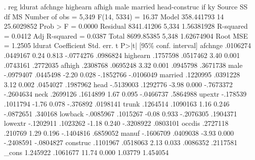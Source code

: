 . reg ldurat afchnge highearn afhigh male married head-construc if ky
{\smallskip}
      Source {\VBAR}       SS           df       MS      Number of obs   =     5,349
   F(14, 5334)     =     16.37
       Model {\VBAR}  358.441793        14  25.6029852   Prob > F        =    0.0000
    Residual {\VBAR}  8341.41206     5,334  1.56381928   R-squared       =    0.0412
   Adj R-squared   =    0.0387
       Total {\VBAR}  8699.85385     5,348  1.62674904   Root MSE        =    1.2505
{\smallskip}
      ldurat {\VBAR} Coefficient  Std. err.      t    P>|t|     [95\% conf. interval]
     afchnge {\VBAR}   .0106274   .0449167     0.24   0.813    -.0774276    .0986824
    highearn {\VBAR}   .1757598   .0517462     3.40   0.001     .0743161    .2772035
      afhigh {\VBAR}   .2308768   .0695248     3.32   0.001     .0945798    .3671738
        male {\VBAR}  -.0979407   .0445498    -2.20   0.028    -.1852766   -.0106049
     married {\VBAR}   .1220995   .0391228     3.12   0.002     .0454027    .1987962
        head {\VBAR}  -.5139003   .1292776    -3.98   0.000    -.7673372   -.2604634
        neck {\VBAR}   .2699126   .1614899     1.67   0.095    -.0466737    .5864988
      upextr {\VBAR}   -.178539   .1011794    -1.76   0.078     -.376892    .0198141
       trunk {\VBAR}   .1264514   .1090163     1.16   0.246    -.0872651     .340168
     lowback {\VBAR}  -.0085967   .1015267    -0.08   0.933    -.2076305    .1904371
     lowextr {\VBAR}  -.1202911   .1023262    -1.18   0.240    -.3208922    .0803101
      occdis {\VBAR}   .2727118    .210769     1.29   0.196    -.1404816    .6859052
       manuf {\VBAR}  -.1606709   .0409038    -3.93   0.000    -.2408591   -.0804827
    construc {\VBAR}   .1101967   .0518063     2.13   0.033     .0086352    .2117581
       _cons {\VBAR}   1.245922   .1061677    11.74   0.000      1.03779    1.454054
{\smallskip}
